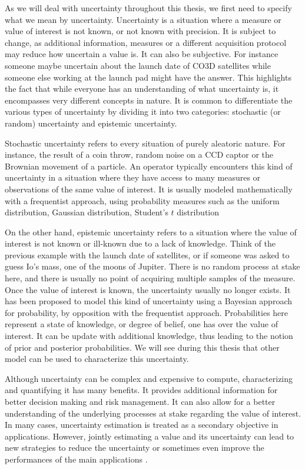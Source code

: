 As we will deal with uncertainty throughout this thesis, we first need to specify what we mean by uncertainty. Uncertainty is a situation where a measure or value of interest is not known, or not known with precision. It is subject to change, as additional information, measures or a different acquisition protocol may reduce how uncertain a value is. It can also be subjective. For instance someone maybe uncertain about the launch date of CO3D satellites while someone else working at the launch pad might have the answer. This highlights the fact that while everyone has an understanding of what uncertainty is, it encompasses very different concepts in nature. It is common to differentiate the various types of uncertainty by dividing it into two categories: stochastic (or random) uncertainty and epistemic uncertainty.

Stochastic uncertainty refers to every situation of purely aleatoric nature. For instance, the result of a coin throw, random noise on a CCD captor or the Brownian movement of a particle. An operator typically encounters this kind of uncertainty in a situation where they have access to many measures or observations of the same value of interest. It is usually modeled mathematically with a frequentist approach, using probability measures such as the uniform distribution, Gaussian distribution, Student's $t$ distribution \etc 

On the other hand, epistemic uncertainty refers to a situation where the value of interest is not known or ill-known due to a lack of knowledge. Think of the previous example with the launch date of satellites, or if someone was asked to guess Io's mass, one of the moons of Jupiter. There is no random process at stake here, and there is usually no point of acquiring multiple samples of the measure. Once the value of interest is known, the uncertainty usually no longer exists. It has been proposed to model this kind of uncertainty using a Bayesian approach for probability, by opposition with the frequentist approach. Probabilities here represent a state of knowledge, or degree of belief, one has over the value of interest. It can be update with additional knowledge, thus leading to the notion of prior and posterior probabilities. We will see during this thesis that other model can be used to characterize this uncertainty. 

Although uncertainty can be complex and expensive to compute, characterizing and quantifying it has many benefits. It provides additional information for better decision making and risk management. It can also allow for a better understanding of the underlying processes at stake regarding the value of interest. In many cases, uncertainty estimation is treated as a secondary objective in applications. However, jointly estimating a value and its uncertainty can lead to new strategies to reduce the uncertainty or sometimes even improve the performances of the main applications \cite{chen_learning_2023,jiang_unsupervised_2024}.

